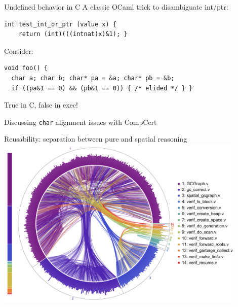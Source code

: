 \documentclass[usenames, xcolor=dvipsnames]{beamer}
\begin{document}
\begin{frame}[fragile]{Undefined behavior in C}  
A classic OCaml trick to disambiguate int/ptr:
    \begin{Verbatim}
int test_int_or_ptr (value x) {
    return (int)(((intnat)x)&1); }
    \end{Verbatim}

\pause \pause

\bigskip

Consider:
\begin{Verbatim}
void foo() {
  char a; char b; char* pa = &a; char* pb = &b;
  if ((pa&1 == 0) && (pb&1 == 0)) { /* elided */ } }
\end{Verbatim}

\pause
True in C, false in exec!

\bigskip

\pause Discussing \texttt{char} alignment issues with CompCert
\end{frame}



\begin{frame}{Reusability: separation between pure and spatial reasoning}
  \centering
  \includegraphics[width=0.9\textwidth]{certigc_theorems.pdf}
\end{frame}
\end{document}
